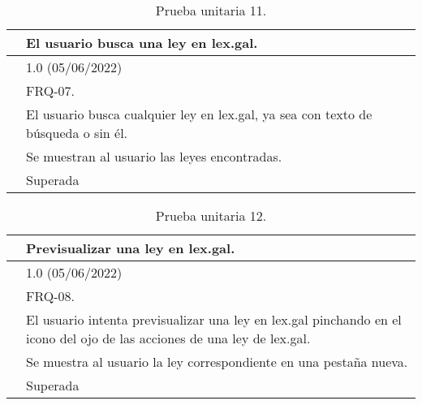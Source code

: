 \begin{table}[H]
\begin{center}
\begin{tabular}{|p{3cm}|p{10cm}|} \hline
\centering {\bf PU-11} & El usuario busca una ley en lex.gal.  \\ \hline\hline
\centering {\bf Versión} & 1.0 (05/06/2022) \\ \hline
\centering {\bf Dependencias} & FRQ-07. \\ \hline
\centering {\bf Descripción} &  El usuario busca cualquier ley en lex.gal, ya sea con texto de búsqueda o sin él. \\ \hline
\centering {\bf Criterio de aceptación} & Se muestran al usuario las leyes encontradas. \\ \hline
\centering {\bf Estado} & Superada \\ \hline
\end{tabular}
\caption{Prueba unitaria 11.}
\label{enlacePU11}
\end{center}
\end{table}

\begin{table}[H]
\begin{center}
\begin{tabular}{|p{3cm}|p{10cm}|} \hline
\centering {\bf PU-12} & Previsualizar una ley en lex.gal.  \\ \hline\hline
\centering {\bf Versión} & 1.0 (05/06/2022) \\ \hline
\centering {\bf Dependencias} & FRQ-08. \\ \hline
\centering {\bf Descripción} &  El usuario intenta previsualizar una ley en lex.gal pinchando en el icono del ojo de las acciones de una ley de lex.gal. \\ \hline
\centering {\bf Criterio de aceptación} & Se muestra al usuario la ley correspondiente en una pestaña nueva. \\ \hline
\centering {\bf Estado} & Superada \\ \hline
\end{tabular}
\caption{Prueba unitaria 12.}
\label{enlacePU12}
\end{center}
\end{table}

